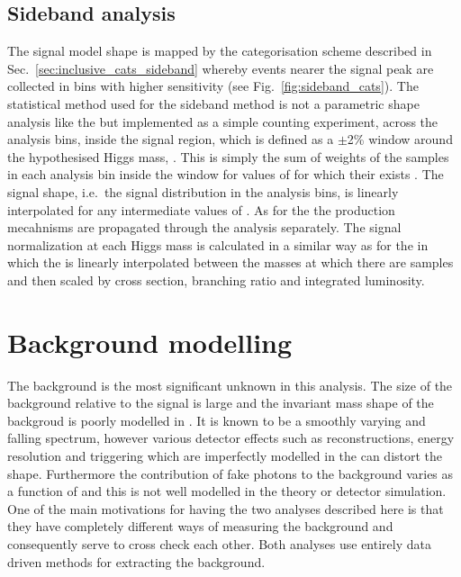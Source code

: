 \subsection{Sideband analysis}
\label{sec:sig_sideband}

The signal model shape is mapped by the categorisation scheme described in Sec.~\ref{sec:inclusive_cats_sideband} whereby events nearer the signal peak are collected in bins with higher sensitivity (see Fig.~\ref{fig:sideband_cats}). The statistical method used for the sideband method is not a parametric shape analysis like the \MFM but implemented as a simple counting experiment, across the analysis bins, inside the signal region, which is defined as a $\pm$2\% window around the hypothesised Higgs mass, \mH. This is simply the sum of weights of the \MC samples in each analysis bin inside the window for values of \mH for which their exists \MC. The signal shape, i.e.~the signal distribution in the analysis bins, is linearly interpolated for any intermediate values of \mH. As for the \MFM the \SM production mecahnisms are propagated through the analysis separately. The signal normalization at each Higgs mass is calculated in a similar way as for the \MFM in which the \ea is linearly interpolated between the masses at which there are \MC samples and then scaled by cross section, branching ratio and integrated luminosity. 

\section{Background modelling}
\label{sec:background_model}

The background is the most significant unknown in this analysis. The size of the background relative to the signal is large and the invariant mass shape of the backgroud is poorly modelled in \MC. It is known to be a smoothly varying and falling spectrum, however various detector effects such as reconstructions, energy resolution and triggering which are imperfectly modelled in the \MC can distort the shape. Furthermore the contribution of fake photons to the background varies as a function of \mgg and this is not well modelled in the theory or detector simulation. One of the main motivations for having the two analyses described here is that they have completely different ways of measuring the background and consequently serve to cross check each other. Both analyses use entirely data driven methods for extracting the background.  

